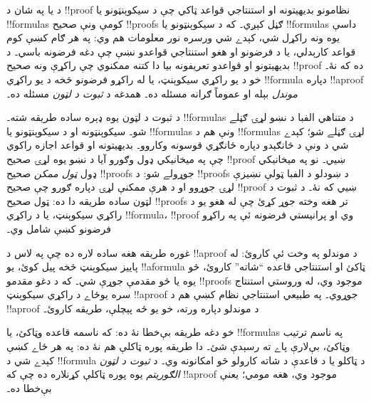 \documentclass[../../../include/open-logic-section]{subfiles}
\begin{document}


د  يا  په شان د !!{proof} نظامونو
بديهيتونه او استنتاجي قواعد ټاکي چې د سيکوېنټونو يا
!!{formula}s کومې ونې صحيح !!{proof}s ګڼل کېږي۔ که د
سيکوېنټونو يا !!{formula}s داسې يوه ونه راکړل شي، کېدے شي
ورسره نور معلومات هم وي: په هر ګام کښې کوم قواعد کارېدلي،
يا د فرضونو او هغو استنتاجي قواعدو نښې چې دغه فرضونه باسي۔
د بديهيتونو او قواعدو تعريفونه بيا دا کتنه ممکنوي چې
راکړې ونه صحيح !!{proof} ده که نۀ۔ خو د يو راکړي سيکوېنټ،
يا له راکړو فرضونو څخه د يو راکړي !!{formula} دپاره
!!a{proof} \emph{موندل} بېله او عموماً ګرانه مسئله ده۔
همدغه د \emph{ثبوت د لټون} مسئله ده۔

د ثبوت د لټون يوه ډېره ساده طريقه شته۔ !!{formula}s د
متناهي الفبا د نښو لړۍ ګڼلے شو۔ سيکوېنټونه او د
سيکوېنټونو يا !!{formula}s ونې هم د !!{formula}s لړۍ
ګڼلے شو؛ کېدے شي د ونې د څانګېدو دپاره ځانګړي قوسونه
وکاروو۔ بديهيتونه او قواعد اجازه راکوي چې په ميخانيکي
ډول وګورو آيا د نښو يوه لړۍ صحيح !!{proof} ښيي۔ نو په
ميخانيکي ډول \emph{ټول ممکن} صحيح !!{proof}s جوړولے شو:
د !!{proof}s د ښودلو د الفبا ټولې نښيزې لړۍ جوړوو او د هرې
ممکنې لړۍ دپاره ګورو چې صحيح !!{proof} ښيي که نۀ۔ د
ثبوت د لټون ساده طريقه دا ده: ټول صحيح !!{proof}s تر
هغه وخته جوړ کړئ چې له هغو يو د راکړي سيکوېنټ، يا د
راکړي !!{formula}، !!{proof} وي او پرانيستي فرضونه ئې په
راکړو فرضونو کښې شامل وي۔

غوره طريقه هغه ساده لاره ده چې په لاس د !!a{proof} د موندلو
په وخت ئې کاروئ: له پاييز سيکوېنټ څخه پيل کوئ، يو
!!a{formula} ټاکئ او استنتاجي قاعده ``شاته'' کاروئ، څو
يوه يا څو مقدمې جوړې شي۔ که د دغو مقدمو !!{proof}s موجود
وي، له وروستي استنتاج سره يوځاے د راکړي سيکوېنټ
!!a{proof} جوړوي۔ په طبيعي استنتاجي نظام کښې هم د
!!a{proof} د موندلو دپاره ورته، خو يو څه پېچلې، طريقه
کاروئ۔

خو دغه طريقه بې‌خطا نۀ ده: که ناسمه قاعده وټاکئ، يا
!!{formula}s په ناسم ترتيب وټاکئ، بې‌لارې پاے ته رسېدې
شئ۔ دا طريقه پوره ټاکلې هم نۀ ده: په هر ځاے کښې کېدے
شي د !!{formula} د ټاکلو يا د قاعدې د شاته کارولو څو
امکانونه وي۔ د \emph{ثبوت د لټون الګوريتم} يوه پوره
ټاکلې کړنلاره ده چې که !!a{proof} موجود وي، هغه مومي؛
يعنې بې‌خطا ده۔
\end{document}

